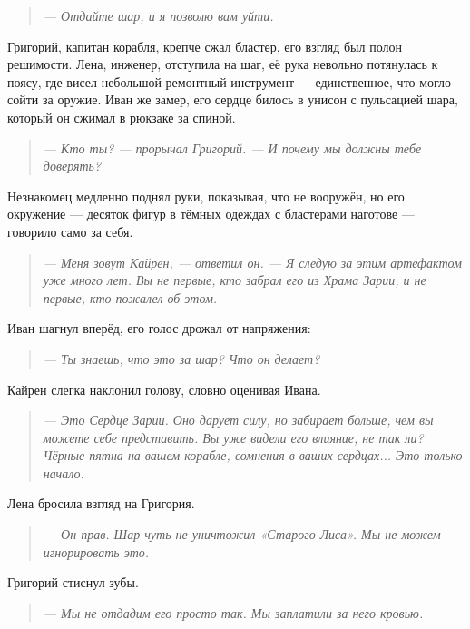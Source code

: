 \documentclass[12pt,a4paper]{book} %
\newenvironment{dialogue}{\begin{quote}\itshape}{\end{quote}}
\begin{document}
\begin{dialogue}
--- Отдайте шар, и я позволю вам уйти.
\end{dialogue}

Григорий, капитан корабля, крепче сжал бластер, его взгляд был полон решимости. Лена, инженер, отступила на шаг, её рука невольно потянулась к поясу, где висел небольшой ремонтный инструмент --- единственное, что могло сойти за оружие. Иван же замер, его сердце билось в унисон с пульсацией шара, который он сжимал в рюкзаке за спиной.

\begin{dialogue}
--- Кто ты? --- прорычал Григорий. --- И почему мы должны тебе доверять?
\end{dialogue}

Незнакомец медленно поднял руки, показывая, что не вооружён, но его окружение --- десяток фигур в тёмных одеждах с бластерами наготове --- говорило само за себя.

\begin{dialogue}
--- Меня зовут Кайрен, --- ответил он. --- Я следую за этим артефактом уже много лет. Вы не первые, кто забрал его из Храма Зарии, и не первые, кто пожалел об этом.
\end{dialogue}

Иван шагнул вперёд, его голос дрожал от напряжения:

\begin{dialogue}
--- Ты знаешь, что это за шар? Что он делает?
\end{dialogue}

Кайрен слегка наклонил голову, словно оценивая Ивана.

\begin{dialogue}
--- Это Сердце Зарии. Оно дарует силу, но забирает больше, чем вы можете себе представить. Вы уже видели его влияние, не так ли? Чёрные пятна на вашем корабле, сомнения в ваших сердцах... Это только начало.
\end{dialogue}

Лена бросила взгляд на Григория.

\begin{dialogue}
--- Он прав. Шар чуть не уничтожил «Старого Лиса». Мы не можем игнорировать это.
\end{dialogue}

Григорий стиснул зубы.

\begin{dialogue}
--- Мы не отдадим его просто так. Мы заплатили за него кровью.
\end{dialogue}
\end{document}
